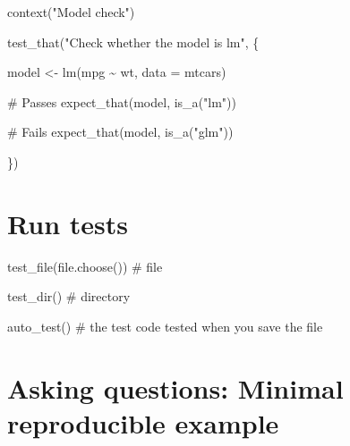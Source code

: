 \documentclass[
  letterpaper,
  DIV=11,
  numbers=noendperiod]{scrreprt}
\newenvironment{Shaded}{\begin{snugshade}}{\end{snugshade}}
\newcommand{\AttributeTok}[1]{\textcolor[rgb]{0.40,0.45,0.13}{#1}}
\newcommand{\CommentTok}[1]{\textcolor[rgb]{0.37,0.37,0.37}{#1}}
\newcommand{\FunctionTok}[1]{\textcolor[rgb]{0.28,0.35,0.67}{#1}}
\newcommand{\NormalTok}[1]{\textcolor[rgb]{0.00,0.23,0.31}{#1}}
\newcommand{\OtherTok}[1]{\textcolor[rgb]{0.00,0.23,0.31}{#1}}
\newcommand{\SpecialCharTok}[1]{\textcolor[rgb]{0.37,0.37,0.37}{#1}}
\newcommand{\StringTok}[1]{\textcolor[rgb]{0.13,0.47,0.30}{#1}}
\begin{document}
\begin{Shaded}
\begin{Highlighting}[]
\FunctionTok{context}\NormalTok{(}\StringTok{"Model check"}\NormalTok{)}

\FunctionTok{test\_that}\NormalTok{(}\StringTok{"Check whether the model is lm"}\NormalTok{, \{}
  
\NormalTok{  model }\OtherTok{\textless{}{-}} \FunctionTok{lm}\NormalTok{(mpg }\SpecialCharTok{\textasciitilde{}}\NormalTok{ wt, }\AttributeTok{data =}\NormalTok{ mtcars)}
  
  \CommentTok{\# Passes}
  \FunctionTok{expect\_that}\NormalTok{(model, }\FunctionTok{is\_a}\NormalTok{(}\StringTok{"lm"}\NormalTok{))}

  \CommentTok{\# Fails}
  \FunctionTok{expect\_that}\NormalTok{(model, }\FunctionTok{is\_a}\NormalTok{(}\StringTok{"glm"}\NormalTok{))}

\NormalTok{\})}
\end{Highlighting}
\end{Shaded}

\hypertarget{run-tests}{%
\section*{Run tests}\label{run-tests}}

\begin{Shaded}
\begin{Highlighting}[]
\FunctionTok{test\_file}\NormalTok{(}\FunctionTok{file.choose}\NormalTok{()) }\CommentTok{\# file }

\FunctionTok{test\_dir}\NormalTok{() }\CommentTok{\# directory}

\FunctionTok{auto\_test}\NormalTok{() }\CommentTok{\# the test code tested when you save the file }
\end{Highlighting}
\end{Shaded}

\hypertarget{asking-questions-minimal-reproducible-example}{%
\section*{Asking questions: Minimal reproducible
example}\label{asking-questions-minimal-reproducible-example}}
\end{document}

